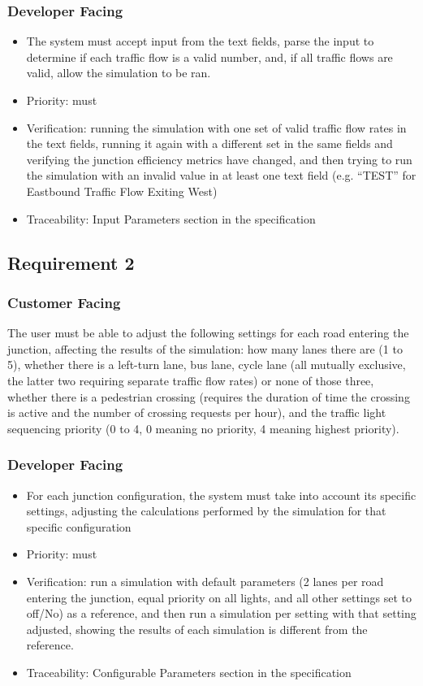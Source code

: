 \documentclass{article}
\begin{document}
\subsubsection{Developer Facing}
\begin{itemize}
  \item The system must accept input from the text fields, parse the input to 
  determine if each traffic flow is a valid number, and, if all traffic flows 
  are valid, allow the simulation to be ran.
  \item Priority: must
  \item Verification: running the simulation with one set of valid traffic 
  flow rates in the text fields, running it again with a different set in 
  the same fields and verifying the junction efficiency metrics have changed, 
  and then trying to run the simulation with an invalid value in at least one 
  text field (e.g. “TEST” for Eastbound Traffic Flow Exiting West)
  \item Traceability: Input Parameters section in the specification
\end{itemize}

\subsection{Requirement 2}
\subsubsection{Customer Facing}
The user must be able to adjust the following settings for each 
road entering the junction, affecting the results of the simulation: how many 
lanes there are (1 to 5), whether there is a left-turn lane, bus lane, cycle 
lane (all mutually exclusive, the latter two requiring separate traffic flow rates) 
or none of those three, whether there is a pedestrian crossing (requires the duration 
of time the crossing is active and the number of crossing requests per hour), 
and the traffic light sequencing priority (0 to 4, 0 meaning no priority, 4 
meaning highest priority).
\subsubsection{Developer Facing}
\begin{itemize}
  \item For each junction configuration, the system must take into account 
  its specific settings, adjusting the calculations performed by the simulation 
  for that specific configuration
  \item Priority: must
  \item Verification: run a simulation with default parameters (2 lanes per 
  road entering the junction, equal priority on all lights, and all other 
  settings set to off/No) as a reference, and then run a simulation per setting 
  with that setting adjusted, showing the results of each simulation is different 
  from the reference.
  \item Traceability: Configurable Parameters section in the specification
\end{itemize}
\end{document}
